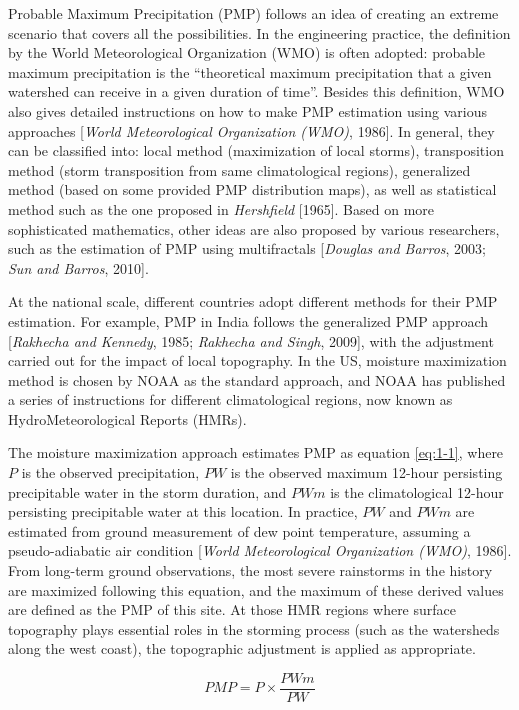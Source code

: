 Probable Maximum Precipitation (PMP) follows an idea of creating an extreme scenario that covers all the possibilities. In the engineering practice, the definition by the World Meteorological Organization (WMO) is often adopted: probable maximum precipitation is the ``theoretical maximum precipitation that a given watershed can receive in a given duration of time''. Besides this definition, WMO also gives detailed instructions on how to make PMP estimation using various approaches [\textit{World Meteorological Organization (WMO)}, 1986]. In general, they can be classified into: local method (maximization of local storms), transposition method (storm transposition from same climatological regions), generalized method (based on some provided PMP distribution maps), as well as statistical method such as the one proposed in \textit{Hershfield} [1965]. Based on more sophisticated mathematics, other ideas are also proposed by various researchers, such as the estimation of PMP using multifractals [\textit{Douglas and Barros}, 2003; \textit{Sun and Barros}, 2010]. 

At the national scale, different countries adopt different methods for their PMP estimation. For example, PMP in India follows the generalized PMP approach [\textit{Rakhecha and Kennedy}, 1985; \textit{Rakhecha and Singh}, 2009], with the adjustment carried out for the impact of local topography. In the US, moisture maximization method is chosen by NOAA as the standard approach, and NOAA has published a series of instructions for different climatological regions, now known as HydroMeteorological Reports (HMRs).

The moisture maximization approach estimates PMP as equation \ref{eq:1-1}, where $P$ is the observed precipitation, $PW$ is the observed maximum 12-hour persisting precipitable water in the storm duration, and $PWm$ is the climatological 12-hour persisting precipitable water at this location. In practice, $PW$ and $PWm$ are estimated from ground measurement of dew point temperature, assuming a pseudo-adiabatic air condition [\textit{World Meteorological Organization (WMO)}, 1986]. From long-term ground observations, the most severe rainstorms in the history are maximized following this equation, and the maximum of these derived values are defined as the PMP of this site. At those HMR regions where surface topography plays essential roles in the storming process (such as the watersheds along the west coast), the topographic adjustment is applied as appropriate.

\begin{equation}
	PMP = P \times{\frac{PWm}{PW}}
	\label{eq:1-1}
\end{equation}

